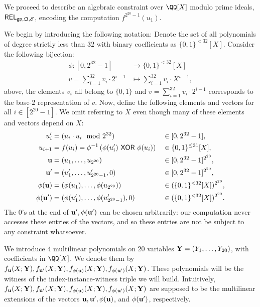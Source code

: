 \documentclass[11pt,letterpaper,usenames,dvipsnames]{article}
\begin{document}
We proceed to describe an algebraic  constraint over $\QQ[X]$ modulo prime ideals, $\mathsf{REL}_{\mathsf{gp}, \mathfrak{Q},\mathcal{S}}$, encoding the computation $f^{2^{20}-1}(u_1)$.

We begin by introducing the following notation: Denote the set of all polynomials of degree strictly less than $32$ with binary coefficients as $\{0,1\}^{< 32}[X]$. Consider the following bijection:
%
\begin{align*}
\phi: [0,2^{32}-1] &\to \{0,1\}^{< 32}[X]\\
v= \sum_{i=1}^{32} v_i\cdot 2^{i-1} &\mapsto \sum_{i=1}^{32} v_i \cdot X^{i-1},
\end{align*}
%
above, the elements $v_i$ all belong to $\{0,1\}$ and $v= \sum_{i=1}^{32} v_i\cdot 2^{i-1}$ corresponds to the base-2 representation of $v$.  Now, define the following elements and vectors  for all $i\in [ 2^{20}-1]$. We omit referring to $X$ even though many of these elements and vectors depend on $X$:
\begin{align*}
  u_i' &= (u_i \cdot u_i \mod 2^{32}) &&\in  [0, 2^{32}-1],\\
  u_{i+1} &=  f(u_i)=\phi^{-1}\left(\phi(u_i') \xor \phi(u_i)\right) &&\in \{0,1\}^{\leq 31}[X],\\
    \uu&=(u_1,\ldots, u_{2^{20}}) &&\in [0,2^{32}-1]^{2^{20}},\\
    \uu' &= (u_1',\ldots, u_{2^{20}-1}', 0) &&\in [0,2^{32}-1]^{2^{20}},\\
        \phi(\uu) &= (\phi(u_1),\ldots, \phi(u_{2^{20}}))&& \in (\{0,1\}^{< 32}[X])^{2^{20}},\\
    \phi(\uu') &= (\phi(u_1'),\ldots, \phi(u_{2^{20}-1}'),0) &&\in (\{0,1\}^{< 32}[X])^{2^{20}}.%
\end{align*}
The $0$'s at the end of $\mathbf{u}', \phi(\mathbf{u}')$ can be chosen arbitrarily: our computation never accesses these entries of the vectors, and so these entries are not be subject to any constraint whatsoever.


We introduce $4$ multilinear polynomials on $20$ variables $\mathbf{Y}=(Y_1,\ldots, Y_{20})$, with coefficients in $\QQ[X]$. We denote them by $f_{\mathbf{u}}(X; \mathbf{Y}), f_{\mathbf{u}'}(X;\mathbf{Y}), f_{\phi(\mathbf{u})}(X;\mathbf{Y}), f_{\phi(\mathbf{u}')}(X;\mathbf{Y})$. These polynomials will be the witness of the index-instance-witness triple we will build. Intuitively, $f_{\mathbf{u}}(X; \mathbf{Y}), f_{\mathbf{u}'}(X;\mathbf{Y}), f_{\phi(\mathbf{u})}(X;\mathbf{Y}), f_{\phi(\mathbf{u}')}(X;\mathbf{Y})$ are supposed to be the multilinear extensions of the vectors $\mathbf{u}, \mathbf{u}', \phi(\mathbf{u})$, and $\phi(\mathbf{u}')$, respectively. 
\end{document}
